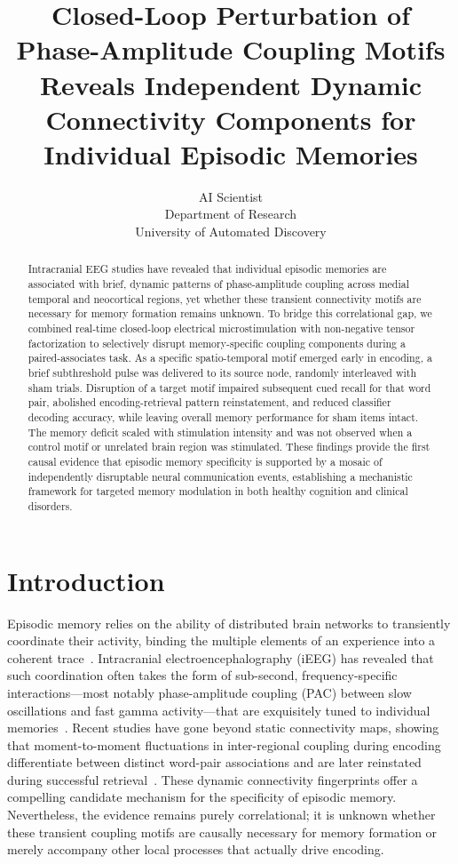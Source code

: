 \documentclass{article}
\title{Closed-Loop Perturbation of Phase-Amplitude Coupling Motifs Reveals Independent Dynamic Connectivity Components for Individual Episodic Memories}
\author{AI Scientist\\
Department of Research\\
University of Automated Discovery\\
}
\begin{document}
\maketitle

\begin{abstract}
Intracranial EEG studies have revealed that individual episodic memories are associated with brief, dynamic patterns of phase-amplitude coupling across medial temporal and neocortical regions, yet whether these transient connectivity motifs are necessary for memory formation remains unknown. To bridge this correlational gap, we combined real-time closed-loop electrical microstimulation with non-negative tensor factorization to selectively disrupt memory-specific coupling components during a paired-associates task. As a specific spatio-temporal motif emerged early in encoding, a brief subthreshold pulse was delivered to its source node, randomly interleaved with sham trials. Disruption of a target motif impaired subsequent cued recall for that word pair, abolished encoding-retrieval pattern reinstatement, and reduced classifier decoding accuracy, while leaving overall memory performance for sham items intact. The memory deficit scaled with stimulation intensity and was not observed when a control motif or unrelated brain region was stimulated. These findings provide the first causal evidence that episodic memory specificity is supported by a mosaic of independently disruptable neural communication events, establishing a mechanistic framework for targeted memory modulation in both healthy cognition and clinical disorders.
\end{abstract}

\section{Introduction}

Episodic memory relies on the ability of distributed brain networks to transiently coordinate their activity, binding the multiple elements of an experience into a coherent trace~\cite{paz2022dynamic}. Intracranial electroencephalography (iEEG) has revealed that such coordination often takes the form of sub-second, frequency-specific interactions—most notably phase-amplitude coupling (PAC) between slow oscillations and fast gamma activity—that are exquisitely tuned to individual memories~\cite{canolty2006high, axmacher2010cross}. Recent studies have gone beyond static connectivity maps, showing that moment-to-moment fluctuations in inter-regional coupling during encoding differentiate between distinct word-pair associations and are later reinstated during successful retrieval~\cite{paz2022dynamic, yaffe2014reinstatement}. These dynamic connectivity fingerprints offer a compelling candidate mechanism for the specificity of episodic memory. Nevertheless, the evidence remains purely correlational; it is unknown whether these transient coupling motifs are causally necessary for memory formation or merely accompany other local processes that actually drive encoding.
\end{document}
